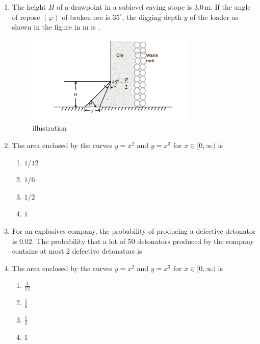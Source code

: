 \documentclass[journal,12pt,onecolumn]{IEEEtran}
\theoremstyle{remark}
\begin{document}
\begin{enumerate}
\item The height $H$ of a drawpoint in a sublevel caving stope is $3.0 \, \text{m}$. If the angle of repose $(\varphi)$ of broken ore is $35^{\circ}$, the digging depth $y$ of the loader as shown in the figure in m is \underline{\hspace{2cm}}.

\hfill{}
\begin{figure}[H]
  \centering
  \includegraphics[width=0.4\columnwidth]{figs/wall.png}
  \caption{illustration}
  \label{fig:wall}
\end{figure}
\item The area enclosed by the curves $y = x^2$ and $y = x^3$ for $x \in [0,\infty)$ is

\hfill{}
\begin{multicols}{4}
\begin{enumerate}
\item $1/12$
\item $1/6$
\item $1/2$
\item $1$
\end{enumerate}  
\end{multicols}
\item For an explosives company, the probability of producing a defective detonator is $0.02$. The
probability that a lot of $50$ detonators produced by the company contains at most $2$ defective
detonators is 
\hfill{}
\item The area enclosed by the curves $y = x^{2}$ and $y = x^{3}$ for $x \in [0,\infty)$ is 

\hfill{}

\begin{multicols}{4}
\begin{enumerate}
\item $\frac{1}{12}$
\item $\frac{1}{6}$
\item $\frac{1}{2}$
\item $1$
\end{enumerate}
\end{multicols}


\end{enumerate}
\end{document}
